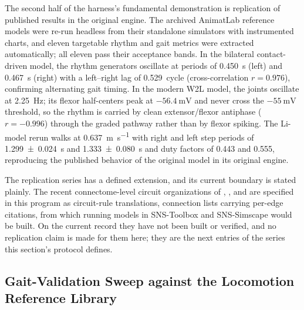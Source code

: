 The second half of the harness's fundamental demonstration is replication of published results in the original engine. The archived AnimatLab reference models were re-run headless from their standalone simulators with instrumented charts, and eleven targetable rhythm and gait metrics were extracted automatically; all eleven pass their acceptance bands. In the bilateral contact-driven model, the rhythm generators oscillate at periods of \qty{0.450}{\second} (left) and \qty{0.467}{\second} (right) with a left--right lag of \qty{0.529}{cycle} (cross-correlation $r = 0.976$), confirming alternating gait timing. In the modern W2L model, the joints oscillate at \qty{2.25}{\Hz}; its flexor half-centers peak at $-\qty{56.4}{\mV}$ and never cross the $-\qty{55}{\mV}$ threshold, so the rhythm is carried by clean extensor/flexor antiphase ($r = -0.996$) through the graded pathway rather than by flexor spiking. The Li-model rerun \citep{li_bipedal_2017} walks at \qty{0.637}{\meter\per\second} with right and left step periods of \qty{1.299 \pm 0.024}{\second} and \qty{1.333 \pm 0.080}{\second} and duty factors of 0.443 and 0.555, reproducing the published behavior of the original model in its original engine.

The replication series has a defined extension, and its current boundary is stated plainly. The recent connectome-level circuit organizations of \citet{shevtsova_modeling_2016}, \citet{dirusso_investigating_2023}, and \citet{shinohara_mechanisms_2025} are specified in this program as circuit-rule translations, connection lists carrying per-edge citations, from which running models in SNS-Toolbox and SNS-Simscape would be built. On the current record they have not been built or verified, and no replication claim is made for them here; they are the next entries of the series this section's protocol defines.

\subsection{Gait-Validation Sweep against the Locomotion Reference Library}\label{sec:gait_library_results}

